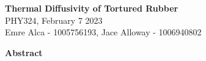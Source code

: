 \documentclass[11pt]{article}
\begin{document}
\begin{center}
    \Large {}  \textbf{Thermal Diffusivity of Tortured Rubber}\\
    \vspace{5pt} 
    \large PHY324, February 7 2023\\
    \vspace{5pt}
    Emre Alca - 1005756193, Jace Alloway - 1006940802
\end{center}

\nd \hrulefill

\vspace{15pt}



 \selectfont \textbf{Abstract}

 \selectfont 

\lipsum[1]\\



\nd \hrulefill

\vspace{5pt}
\end{document}
